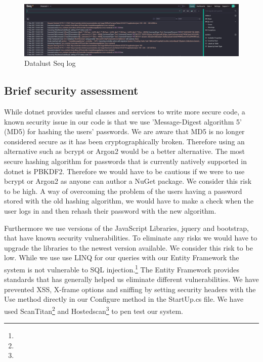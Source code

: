 \documentclass{article}
\begin{document}
\begin{figure}[H]
\centering
\includegraphics[width=1\textwidth]{images/DatalustSeq.PNG}
\caption{\label{fig:seqlog} Datalust Seq log}
\end{figure}

\subsection{Brief security assessment} 
While dotnet provides useful classes and services to write more secure code, a known security issue in our code is that we use 'Message-Digest algorithm 5' (MD5) for hashing the users' passwords. We are aware that MD5 is no longer considered secure as it has been cryptographically broken. Therefore using an alternative such as bcrypt or Argon2 would be a better alternative. The most secure hashing algorithm for passwords that is currently natively supported in dotnet is PBKDF2. Therefore we would have to be cautious if we were to use bcrypt or Argon2 as anyone can author a NuGet package. We consider this risk to be high. A way of overcoming the problem of the users having a password stored with the old hashing algorithm, we would have to make a check when the user logs in and then rehash their password with the new algorithm.

Furthermore we use versions of the JavaScript Libraries, jquery and bootstrap, that have known security vulnerabilities. To eliminate any risks we would have to upgrade the libraries to the newest version available. We consider this risk to be low. 
While we use use LINQ for our queries with our Entity Framework the system is not vulnerable to SQL injection.\footnote{\myurl} The Entity Framework provides standards that has generally helped us eliminate different vulnerabilities. We have prevented XSS, X-frame options and sniffing by setting security headers with the Use method directly in our Configure method in the StartUp.cs file. We have used ScanTitan\footnote{\urlTit} and Hostedscan\footnote{\urlScanHost} to pen test our system. 
\end{document}
